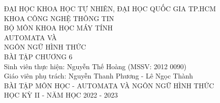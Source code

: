 \documentclass[12pt, a4paper]{article}
\begin{document}
	

	\begin{titlepage}
		\centering
		\large
		ĐẠI HỌC KHOA HỌC TỰ NHIÊN, ĐẠI HỌC QUỐC GIA TP.HCM\\[.1in]
		KHOA CÔNG NGHỆ THÔNG TIN\\BỘ MÔN KHOA HỌC MÁY TÍNH\\
		\vfill
		\huge AUTOMATA VÀ\\NGÔN NGỮ HÌNH THỨC\\[.1in]
		\LARGE BÀI TẬP CHƯƠNG 6\\
		\vfill
		\RaggedRight
		\large
		Sinh viên thực hiện: Nguyễn Thế Hoàng (MSSV: 2012 0090)\\[.1in]
		Giáo viên phụ trách: Nguyễn Thanh Phương - Lê Ngọc Thành\\[.2in]
		\Centering
		BÀI TẬP MÔN HỌC - AUTOMATA VÀ NGÔN NGỮ HÌNH THỨC\\[.1in]
		HỌC KỲ II - NĂM HỌC 2022 - 2023
	\end{titlepage}
	
	\newpage	
	
	
\end{document}
